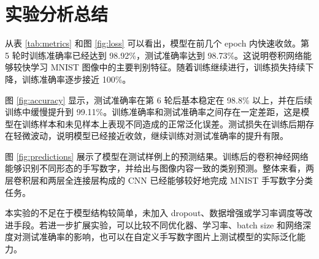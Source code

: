 \documentclass[UTF8,a4paper,10pt]{ctexart}
\begin{document}
\section{实验分析总结}
从表 \ref{tab:metrics} 和图 \ref{fig:loss} 可以看出，模型在前几个 epoch 内快速收敛。第 5 轮时训练准确率已经达到 98.92\%，测试准确率达到 98.73\%。这说明卷积网络能够较快学习 MNIST 图像中的主要判别特征。随着训练继续进行，训练损失持续下降，训练准确率逐步接近 100\%。

图 \ref{fig:accuracy} 显示，测试准确率在第 6 轮后基本稳定在 98.8\% 以上，并在后续训练中缓慢提升到 99.11\%。训练准确率和测试准确率之间存在一定差距，这是模型在训练样本和未见样本上表现不同造成的正常泛化误差。测试损失在训练后期存在轻微波动，说明模型已经接近收敛，继续训练对测试准确率的提升有限。

图 \ref{fig:predictions} 展示了模型在测试样例上的预测结果。训练后的卷积神经网络能够识别不同形态的手写数字，并给出与图像内容一致的类别预测。整体来看，两层卷积层和两层全连接层构成的 CNN 已经能够较好地完成 MNIST 手写数字分类任务。

本实验的不足在于模型结构较简单，未加入 dropout、数据增强或学习率调度等改进手段。若进一步扩展实验，可以比较不同优化器、学习率、batch size 和网络深度对测试准确率的影响，也可以在自定义手写数字图片上测试模型的实际泛化能力。

\newpage
\nocite{*}


\end{document}
